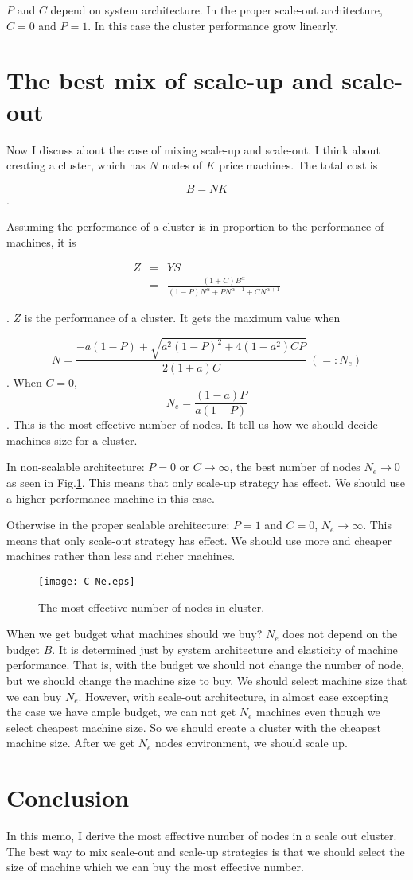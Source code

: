 \documentclass[a4paper,11pt]{article}
\begin{document}
$P$ and $C$ depend on system architecture. In the proper scale-out architecture, $C = 0$ and $P = 1$. In this case the cluster performance grow linearly.

\section{The best mix of scale-up and scale-out}

Now I discuss about the case of mixing scale-up and scale-out. I think about creating a cluster, which has $N$ nodes of $K$ price machines. The total cost is 

$$
B = NK
$$
.

Assuming the performance of a cluster is in proportion to the performance of machines, it is

\begin{eqnarray*}
Z &=& YS\\
  &=&\frac{(1 + C) B^\alpha}{(1-P) N^\alpha + P N^{\alpha-1} + C N^{\alpha + 1}}
\end{eqnarray*}

. $Z$ is the performance of a cluster. It gets the maximum value when

$$
N = \frac{-a(1-P)+\sqrt{a^2(1-P)^2 + 4(1-a^2)CP}}{2(1+a)C} ~ ( =: N_e)
$$
. When $C=0$,
$$
N_e = \frac{(1-a)P}{a(1-P)}
$$
. This is the most effective number of nodes. 
It tell us how we should decide machines size for a cluster. 

In non-scalable architecture: $P=0$ or $C \to \infty$, the best number of nodes 
$N_e \to 0$ as seen in Fig.\ref{C-Ne}. This means that only scale-up strategy has effect. We should use a higher performance machine in this case.

Otherwise in the proper scalable architecture: $P=1$ and $C = 0$, $N_e \to \infty$.
This means that only scale-out strategy has effect.
We should use more and cheaper machines rather than less and richer machines.

\begin{figure}
\begin{center}
\texttt{[image: C-Ne.eps]}
\caption{The most effective number of nodes in cluster.}
\label{C-Ne}
\end{center}
\end{figure}

When we get budget what machines should we buy?
$N_e$ does not depend on the budget $B$.
It is determined just by system architecture and elasticity of machine performance.
That is, with the budget we should not change the number of node,
but we should change the machine size to buy.
We should select machine size that we can buy $N_e$.
However, with scale-out architecture, in almost case excepting the case we have ample budget, we can not get $N_e$ machines even though we select cheapest machine size.
So we should create a cluster with the cheapest machine size.
After we get $N_e$ nodes environment, we should scale up.

\section{Conclusion}

In this memo, I derive the most effective number of nodes in a scale out cluster. The best way to mix scale-out and scale-up strategies is that we should select the size of machine which we can buy the most effective number.
\end{document}

